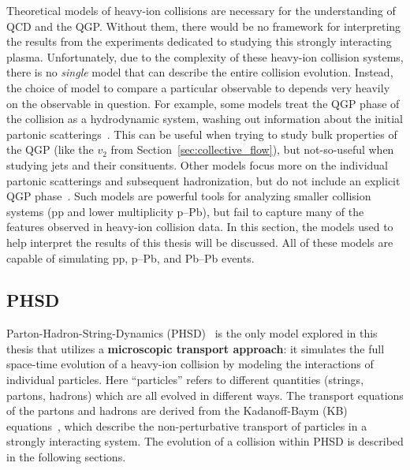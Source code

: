 Theoretical models of heavy-ion collisions are necessary for the understanding of QCD and the QGP. Without them, there would be no framework for interpreting the results from the experiments dedicated to studying this strongly interacting plasma. Unfortunately, due to the complexity of these heavy-ion collision systems, there is no \textit{single} model that can describe the entire collision evolution. Instead, the choice of model to compare a particular observable to depends very heavily on the observable in question. For example, some models treat the QGP phase of the collision as a hydrodynamic system, washing out information about the initial partonic scatterings~\cite{EPOS}. This can be useful when trying to study bulk properties of the QGP (like the $v_2$ from Section~\ref{sec:collective_flow}), but not-so-useful when studying jets and their consituents. Other models focus more on the individual partonic scatterings and subsequent hadronization, but do not include an explicit QGP phase~\cite{Pythia, DPMJet}. Such models are powerful tools for analyzing smaller collision systems (pp and lower multiplicity p--Pb), but fail to capture many of the features observed in heavy-ion collision data. In this section, the models used to help interpret the results of this thesis will be discussed. All of these models are capable of simulating pp, p--Pb, and Pb--Pb events.

\subsection{PHSD}
Parton-Hadron-String-Dynamics (PHSD)~\cite{PHSD1, PHSD2} is the only model explored in this thesis that utilizes a \textbf{microscopic transport approach}: it simulates the full space-time evolution of a heavy-ion collision by modeling the interactions of individual particles. Here ``particles'' refers to different quantities (strings, partons, hadrons) which are all evolved in different ways. The transport equations of the partons and hadrons are derived from the Kadanoff-Baym (KB) equations~\cite{KBEq}, which describe the non-perturbative transport of particles in a strongly interacting system. The evolution of a collision within PHSD is described in the following sections.

